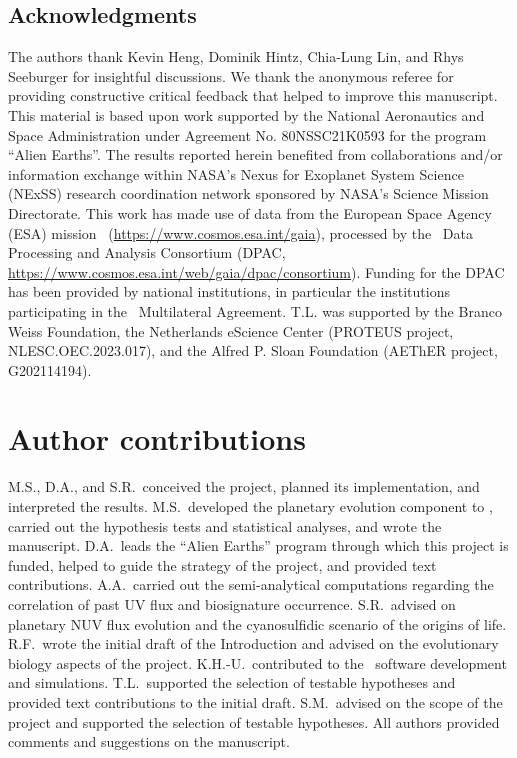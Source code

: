 \begin{acknowledgments}
\section*{Acknowledgments}
    The authors thank Kevin Heng, Dominik Hintz, Chia-Lung Lin, and Rhys Seeburger for insightful discussions.
    We thank the anonymous referee for providing constructive critical feedback that helped to improve this manuscript.
    This material is based upon work supported by the National Aeronautics and Space Administration under Agreement No. 80NSSC21K0593 for the program ``Alien Earths''.
    The results reported herein benefited from collaborations and/or information exchange within NASA’s Nexus for Exoplanet System Science (NExSS) research coordination network sponsored by NASA’s Science Mission Directorate.
    This work has made use of data from the European Space Agency (ESA) mission \gaia\ (\url{https://www.cosmos.esa.int/gaia}), processed by the \gaia\ Data Processing and Analysis Consortium (DPAC, \url{https://www.cosmos.esa.int/web/gaia/dpac/consortium}). Funding for the DPAC has been provided by national institutions, in particular the institutions participating in the \gaia\ Multilateral Agreement.
    T.L. was supported by the Branco Weiss Foundation, the Netherlands eScience Center (PROTEUS project, NLESC.OEC.2023.017), and the Alfred P. Sloan Foundation (AEThER project, G202114194).
\end{acknowledgments}

\section*{Author contributions}
M.S., D.A., and S.R.\ conceived the project, planned its implementation, and interpreted the results.
M.S.\ developed the planetary evolution component to \bioverse, carried out the hypothesis tests and statistical analyses, and wrote the manuscript.
D.A.\ leads the ``Alien Earths'' program through which this project is funded, helped to guide the strategy of the project, and provided text contributions.
A.A.\ carried out the semi-analytical computations regarding the correlation of past UV flux and biosignature occurrence.
S.R.\ advised on planetary \gls{NUV} flux evolution and the cyanosulfidic scenario of the origins of life.
R.F.\ wrote the initial draft of the Introduction and advised on the evolutionary biology aspects of the project.
K.H.-U.\ contributed to the \bioverse\ software development and simulations.
T.L.\ supported the selection of testable hypotheses and provided text contributions to the initial draft.
S.M.\ advised on the scope of the project and supported the selection of testable hypotheses.
All authors provided comments and suggestions on the manuscript.


